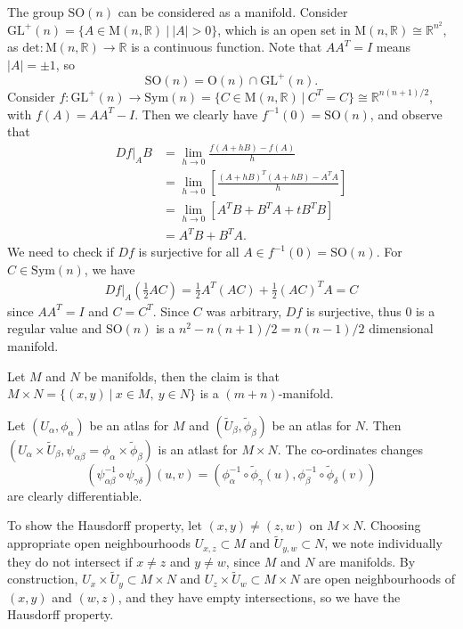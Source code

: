 \documentclass[letter-paper]{tufte-book}
\newenvironment{example}[1][Example]{\begin{trivlist}
\item[\hskip \labelsep {\bfseries #1}]}{\end{trivlist}}
\begin{document}
\begin{example}
  The group $\mbox{SO}(n)$ can be considered as a manifold. Consider $\mbox{GL}^+(n) = \{A \in \mbox{M}(n, \mathbb{R})\ |\ |A| > 0\}$, which is an open set in $\mbox{M}(n, \mathbb{R}) \cong \mathbb{R}^{n^2}$, as $\mbox{det} : \mbox{M}(n, \mathbb{R}) \to \mathbb{R}$ is a continuous function. Note that $AA^T = I$ means $|A| = \pm 1$, so
  \begin{equation*}
    \mbox{SO}(n) = \mbox{O}(n) \cap \mbox{GL}^+(n).
  \end{equation*}
  Consider $f : \mbox{GL}^+(n) \to \mbox{Sym}(n) = \{C \in \mbox{M}(n, \mathbb{R})\ |\ C^T = C\} \cong \mathbb{R}^{n(n+1)/2}$, with $f(A) = AA^T - I$. Then we clearly have $f^{-1}(0) = \mbox{SO}(n)$, and observe that
  \begin{align*}
    \left.Df\right|_A B 
      &= \lim_{h \to 0} \frac{f(A + hB) - f(A)}{h}\\
      &= \lim_{h \to 0} \left[ \frac{(A + hB)^T (A + hB) - A^T A}{h} \right]\\
      &= \lim_{h \to 0} \left[ A^T B + B^T A + t B^T B \right]\\
      &= A^T B + B^T A.
  \end{align*}
  We need to check if $Df$ is surjective for all $A \in f^{-1}(0) = \mbox{SO}(n)$. For $C \in \mbox{Sym}(n)$, we have
  \begin{align*}
    \left.Df\right|_A \left(\frac{1}{2}AC \right) = \frac{1}{2} A^T (AC) + \frac{1}{2}(AC)^T A = C
  \end{align*}
  since $AA^T = I$ and $C = C^T$. Since $C$ was arbitrary, $Df$ is surjective, thus $0$ is a regular value and $\mbox{SO}(n)$ is a $n^2 - n(n+1)/2 = n(n-1)/2$ dimensional manifold.
\end{example}

\begin{example}
  Let $M$ and $N$ be manifolds, then the claim is that $M\times N = \{(x,y)\ |\ x\in M,\ y\in N\}$ is a $(m+n)$-manifold. 
  
  Let $(U_\alpha, \phi_\alpha)$ be an atlas for $M$ and $(\tilde{U}_\beta, \tilde{\phi}_\beta)$ be an atlas for $N$. Then $(U_\alpha \times \tilde{U}_\beta, \psi_{\alpha\beta} = \phi_\alpha \times \tilde{\phi}_\beta)$ is an atlast for $M\times N$. The co-ordinates changes
  \begin{equation*}
    \left(\psi_{\alpha\beta}^{-1} \circ \psi_{\gamma\delta}\right)(u,v) = \left(\phi_\alpha^{-1}\circ \tilde{\phi}_\gamma (u), \phi_\beta^{-1}\circ \tilde{\phi}_\delta (v)\right)
  \end{equation*}
  are clearly differentiable. 
  
  To show the Hausdorff property, let $(x,y) \neq (z,w)$ on $M\times N$. Choosing appropriate open neighbourhoods $U_{x,z} \subset M$ and $\tilde{U}_{y,w} \subset N$, we note individually they do not intersect if $x\neq z$ and $y\neq w$, since $M$ and $N$ are manifolds. By construction, $U_x \times \tilde{U}_y \subset M\times N$ and $U_z \times \tilde{U}_w \subset M\times N$ are open neighbourhoods of $(x,y)$ and $(w,z)$, and they have empty intersections, so we have the Hausdorff property.
\end{example}
\end{document}

